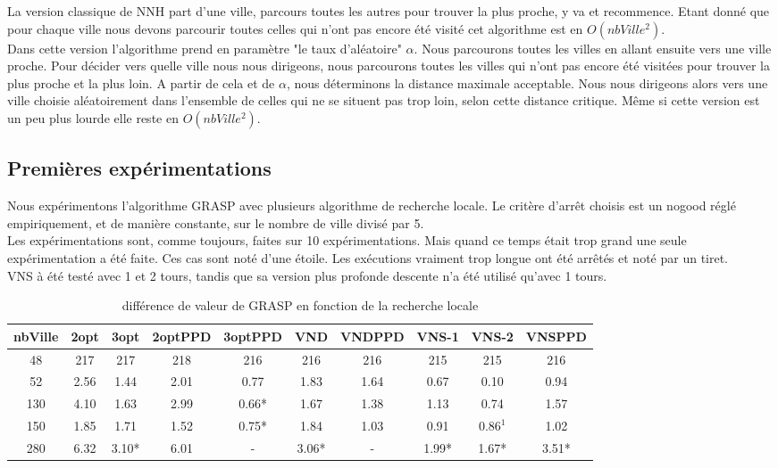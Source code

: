 \documentclass[12pt,a4paper]{article}
\begin{document}
La version classique de NNH part d'une ville, parcours toutes les autres pour trouver la plus proche, y va et recommence.  Etant donné que pour chaque ville nous devons parcourir toutes celles qui n'ont pas encore été visité cet algorithme est en $O(nbVille ^2)$.\\

Dans cette version l'algorithme prend en paramètre "le taux d'aléatoire" $\alpha$. Nous parcourons toutes les villes en allant ensuite vers une ville proche. Pour décider vers quelle ville nous nous dirigeons, nous parcourons toutes les villes qui n'ont pas encore été visitées pour trouver la plus proche et la plus loin. A partir de cela et de $\alpha$, nous déterminons la distance maximale acceptable. Nous nous dirigeons alors vers une ville choisie aléatoirement dans l'ensemble de celles qui ne se situent pas trop loin, selon cette distance critique. Même si cette version est un peu plus lourde elle reste en $O(nbVille ^2)$.\\

\subsection{Premières expérimentations}

Nous expérimentons l'algorithme GRASP avec plusieurs algorithme de recherche locale. Le critère d’arrêt choisis est un nogood réglé empiriquement, et de manière constante, sur le nombre de ville divisé par 5.\\
Les expérimentations sont, comme toujours, faites sur 10 expérimentations. Mais quand ce temps était trop grand une seule expérimentation a été faite. Ces cas sont noté d'une étoile. Les exécutions vraiment trop longue ont été arrêtés et noté par un tiret.\\
VNS à été testé avec 1 et 2 tours, tandis que sa version plus profonde descente n'a été utilisé qu'avec 1 tours.\\

\begin{table}[!h]
\leftskip -0.7cm
{
\begin{tabular}{|*{10}{c|}}
  \hline
  nbVille & 2opt & 3opt & 2optPPD & 3optPPD & VND & VNDPPD & VNS-1 & VNS-2 & VNSPPD \\
  \hline
  48 & 217 & 217 & 218 & 216 & 216 & 216 & 215 & 215 & 216 \\ 
  52 & 2.56 & 1.44 & 2.01 & 0.77 & 1.83 & 1.64 & 0.67 & 0.10 & 0.94 \\
  130 & 4.10 & 1.63 & 2.99 & 0.66* & 1.67 & 1.38 & 1.13 & 0.74 & 1.57 \\
  150 & 1.85 & 1.71 & 1.52 &  0.75* & 1.84 & 1.03 & 0.91 & $0.86^1$ & 1.02 \\  
  280 & 6.32 & 3.10* & 6.01 & - & 3.06* & - & 1.99* & 1.67* & 3.51* \\
  \hline
\end{tabular}
}
\caption{différence de valeur de GRASP en fonction de la recherche locale}
\label{recherchelocaleGRASPvaleurs}
\end{table}
\end{document}
